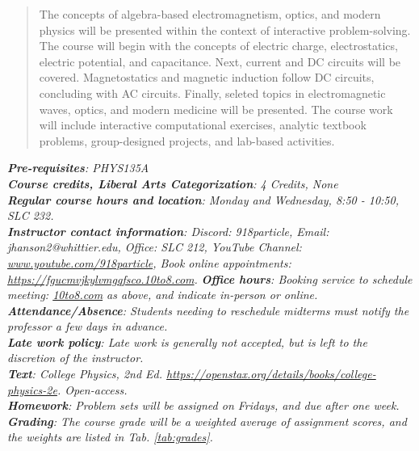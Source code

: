 \documentclass[10pt]{article}
\begin{document}
\maketitle

\begin{abstract}
The concepts of algebra-based electromagnetism, optics, and modern physics will be presented within the context of interactive problem-solving.  The course will begin with the concepts of electric charge, electrostatics, electric potential, and capacitance.  Next, current and DC circuits will be covered.  Magnetostatics and magnetic induction follow DC circuits, concluding with AC circuits.  Finally, seleted topics in electromagnetic waves, optics, and modern medicine will be presented.  The course work will include interactive computational exercises, analytic textbook problems, group-designed projects, and lab-based activities.
\end{abstract}
\noindent
\textit{\textbf{Pre-requisites}: PHYS135A} \\
\textit{\textbf{Course credits, Liberal Arts Categorization}: 4 Credits, None} \\
\textit{\textbf{Regular course hours and location}: Monday and Wednesday, 8:50 - 10:50, SLC 232.} \\
\textit{\textbf{Instructor contact information}: Discord: 918particle, Email: jhanson2@whittier.edu, Office: SLC 212, YouTube Channel: \url{www.youtube.com/918particle}, Book online appointments: \url{https://fgucmvjkylvmgqfsco.10to8.com}.}
\noindent
\textit{\textbf{Office hours}: Booking service to schedule meeting: \url{10to8.com} as above, and indicate in-person or online.} \\
\textit{\textbf{Attendance/Absence}: Students needing to reschedule midterms must notify the professor a few days in advance.} \\ 
\textit{\textbf{Late work policy}: Late work is generally not accepted, but is left to the discretion of the instructor.} \\
\textit{\textbf{Text}: College Physics, 2nd Ed. \url{https://openstax.org/details/books/college-physics-2e}. Open-access.} \\
\textit{\textbf{Homework}: Problem sets will be assigned on Fridays, and due after one week.} \\
\textit{\textbf{Grading}: The course grade will be a weighted average of assignment scores, and the weights are listed in Tab. \ref{tab:grades}.}
\end{document}
